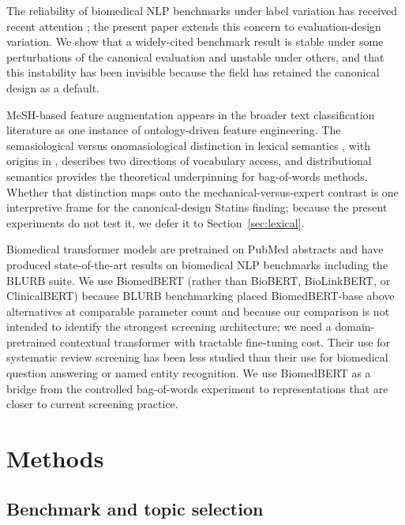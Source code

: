 \documentclass{article}
\begin{document}
The reliability of biomedical NLP benchmarks under label variation has received recent attention \cite{plank2022}; the present paper extends this concern to evaluation-design variation. We show that a widely-cited benchmark result is stable under some perturbations of the canonical evaluation and unstable under others, and that this instability has been invisible because the field has retained the canonical design as a default.

MeSH-based feature augmentation appears in the broader text classification literature as one instance of ontology-driven feature engineering. The semasiological versus onomasiological distinction in lexical semantics \cite{baldinger1980,geeraerts2010}, with origins in , describes two directions of vocabulary access, and distributional semantics \cite{harris1954distributional,sahlgren2008,lenci2018} provides the theoretical underpinning for bag-of-words methods. Whether that distinction maps onto the mechanical-versus-expert contrast is one interpretive frame for the canonical-design Statins finding; because the present experiments do not test it, we defer it to Section~\ref{sec:lexical}.

Biomedical transformer models \cite{gu2021biomedbert,lee2020biobert,yasunaga2022linkbert} are pretrained on PubMed abstracts and have produced state-of-the-art results on biomedical NLP benchmarks including the BLURB suite. We use BiomedBERT (rather than BioBERT, BioLinkBERT, or ClinicalBERT) because BLURB benchmarking placed BiomedBERT-base above alternatives at comparable parameter count \cite{gu2021biomedbert} and because our comparison is not intended to identify the strongest screening architecture; we need a domain-pretrained contextual transformer with tractable fine-tuning cost. Their use for systematic review screening has been less studied than their use for biomedical question answering or named entity recognition. We use BiomedBERT as a bridge from the controlled bag-of-words experiment to representations that are closer to current screening practice.

\section{Methods}

\subsection{Benchmark and topic selection}
\end{document}
